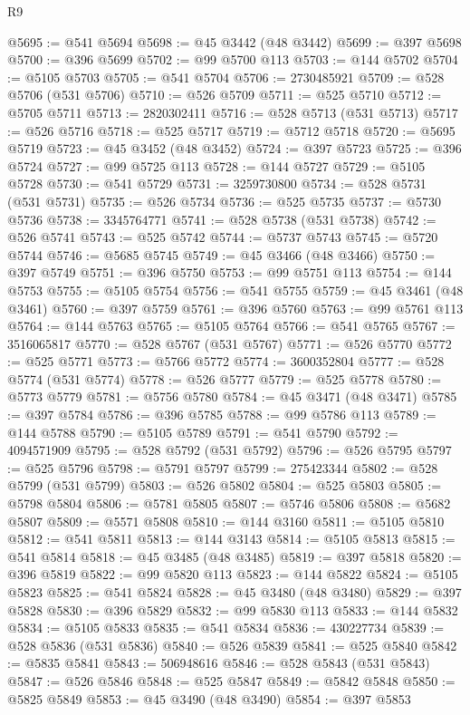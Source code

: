 \begin{lexlean}{R9}
\begin{coremodule}
@5695 := @541 @5694
@5698 := @45 @3442 (@48 @3442)
@5699 := @397 @5698
@5700 := @396 @5699
@5702 := @99 @5700 @113
@5703 := @144 @5702
@5704 := @5105 @5703
@5705 := @541 @5704
@5706 := 2730485921
@5709 := @528 @5706 (@531 @5706)
@5710 := @526 @5709
@5711 := @525 @5710
@5712 := @5705 @5711
@5713 := 2820302411
@5716 := @528 @5713 (@531 @5713)
@5717 := @526 @5716
@5718 := @525 @5717
@5719 := @5712 @5718
@5720 := @5695 @5719
@5723 := @45 @3452 (@48 @3452)
@5724 := @397 @5723
@5725 := @396 @5724
@5727 := @99 @5725 @113
@5728 := @144 @5727
@5729 := @5105 @5728
@5730 := @541 @5729
@5731 := 3259730800
@5734 := @528 @5731 (@531 @5731)
@5735 := @526 @5734
@5736 := @525 @5735
@5737 := @5730 @5736
@5738 := 3345764771
@5741 := @528 @5738 (@531 @5738)
@5742 := @526 @5741
@5743 := @525 @5742
@5744 := @5737 @5743
@5745 := @5720 @5744
@5746 := @5685 @5745
@5749 := @45 @3466 (@48 @3466)
@5750 := @397 @5749
@5751 := @396 @5750
@5753 := @99 @5751 @113
@5754 := @144 @5753
@5755 := @5105 @5754
@5756 := @541 @5755
@5759 := @45 @3461 (@48 @3461)
@5760 := @397 @5759
@5761 := @396 @5760
@5763 := @99 @5761 @113
@5764 := @144 @5763
@5765 := @5105 @5764
@5766 := @541 @5765
@5767 := 3516065817
@5770 := @528 @5767 (@531 @5767)
@5771 := @526 @5770
@5772 := @525 @5771
@5773 := @5766 @5772
@5774 := 3600352804
@5777 := @528 @5774 (@531 @5774)
@5778 := @526 @5777
@5779 := @525 @5778
@5780 := @5773 @5779
@5781 := @5756 @5780
@5784 := @45 @3471 (@48 @3471)
@5785 := @397 @5784
@5786 := @396 @5785
@5788 := @99 @5786 @113
@5789 := @144 @5788
@5790 := @5105 @5789
@5791 := @541 @5790
@5792 := 4094571909
@5795 := @528 @5792 (@531 @5792)
@5796 := @526 @5795
@5797 := @525 @5796
@5798 := @5791 @5797
@5799 := 275423344
@5802 := @528 @5799 (@531 @5799)
@5803 := @526 @5802
@5804 := @525 @5803
@5805 := @5798 @5804
@5806 := @5781 @5805
@5807 := @5746 @5806
@5808 := @5682 @5807
@5809 := @5571 @5808
@5810 := @144 @3160
@5811 := @5105 @5810
@5812 := @541 @5811
@5813 := @144 @3143
@5814 := @5105 @5813
@5815 := @541 @5814
@5818 := @45 @3485 (@48 @3485)
@5819 := @397 @5818
@5820 := @396 @5819
@5822 := @99 @5820 @113
@5823 := @144 @5822
@5824 := @5105 @5823
@5825 := @541 @5824
@5828 := @45 @3480 (@48 @3480)
@5829 := @397 @5828
@5830 := @396 @5829
@5832 := @99 @5830 @113
@5833 := @144 @5832
@5834 := @5105 @5833
@5835 := @541 @5834
@5836 := 430227734
@5839 := @528 @5836 (@531 @5836)
@5840 := @526 @5839
@5841 := @525 @5840
@5842 := @5835 @5841
@5843 := 506948616
@5846 := @528 @5843 (@531 @5843)
@5847 := @526 @5846
@5848 := @525 @5847
@5849 := @5842 @5848
@5850 := @5825 @5849
@5853 := @45 @3490 (@48 @3490)
@5854 := @397 @5853

\end{coremodule}
\end{lexlean}
